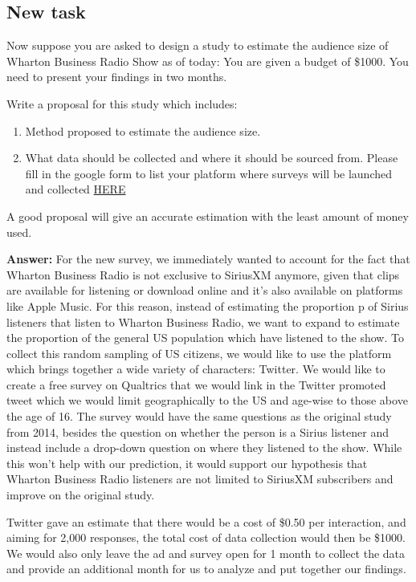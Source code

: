 \documentclass[
]{article}
\providecommand{\tightlist}{%
  \setlength{\itemsep}{0pt}\setlength{\parskip}{0pt}}
\begin{document}
\hypertarget{new-task}{%
\subsection{New task}\label{new-task}}

Now suppose you are asked to design a study to estimate the audience
size of Wharton Business Radio Show as of today: You are given a budget
of \$1000. You need to present your findings in two months.

Write a proposal for this study which includes:

\begin{enumerate}
\def\labelenumi{\arabic{enumi}.}
\tightlist
\item
  Method proposed to estimate the audience size.
\item
  What data should be collected and where it should be sourced from.
  Please fill in the google form to list your platform where surveys
  will be launched and collected
  \href{https://forms.gle/8SmjFQ1tpqr6c4sa8}{HERE}
\end{enumerate}

A good proposal will give an accurate estimation with the least amount
of money used.

\textbf{Answer:} For the new survey, we immediately wanted to account
for the fact that Wharton Business Radio is not exclusive to SiriusXM
anymore, given that clips are available for listening or download online
and it's also available on platforms like Apple Music. For this reason,
instead of estimating the proportion p of Sirius listeners that listen
to Wharton Business Radio, we want to expand to estimate the proportion
of the general US population which have listened to the show. To collect
this random sampling of US citizens, we would like to use the platform
which brings together a wide variety of characters: Twitter. We would
like to create a free survey on Qualtrics that we would link in the
Twitter promoted tweet which we would limit geographically to the US and
age-wise to those above the age of 16. The survey would have the same
questions as the original study from 2014, besides the question on
whether the person is a Sirius listener and instead include a drop-down
question on where they listened to the show. While this won't help with
our prediction, it would support our hypothesis that Wharton Business
Radio listeners are not limited to SiriusXM subscribers and improve on
the original study.

Twitter gave an estimate that there would be a cost of \$0.50 per
interaction, and aiming for 2,000 responses, the total cost of data
collection would then be \$1000. We would also only leave the ad and
survey open for 1 month to collect the data and provide an additional
month for us to analyze and put together our findings.
\end{document}
